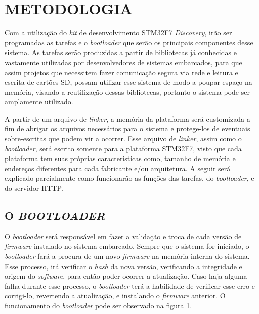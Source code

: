 
\chapter{METODOLOGIA}
\label{chap:metodologia}
Com a utilização do \textit{kit} de desenvolvimento STM32F7 \textit{Discovery}, irão ser programadas as tarefas e o \textit{bootloader} que serão os principais componentes desse sistema. As tarefas serão produzidas a partir de bibliotecas já conhecidas e vastamente utilizadas por desenvolvedores de sistemas embarcados, para que assim projetos que necessitem fazer comunicação segura via rede e leitura e escrita de cartões SD, possam utilizar esse sistema de modo a poupar espaço na memória, visando a reutilização dessas bibliotecas, portanto o sistema pode ser amplamente utilizado.


A partir de um arquivo de \textit{linker}, a memória da plataforma será customizada a fim de abrigar os arquivos necessários para o sistema e protege-los de eventuais sobre-escritas que podem vir a ocorrer. Esse arquivo de \textit{linker}, assim como o \textit{bootloader}, será escrito somente para a plataforma STM32F7, visto que cada plataforma tem suas próprias características como, tamanho de memória e endereços diferentes para cada fabricante e/ou arquitetura. A seguir será explicado parcialmente como funcionarão as funções das tarefas, do \textit{bootloader}, e do servidor HTTP.

\section{O \textit{BOOTLOADER}}
\label{sec:Bootloader}

O \textit{bootloader} será responsável em fazer a validação e troca de cada versão de \textit{firmware} instalado no sistema embarcado. Sempre que o sistema for iniciado, o \textit{bootloader} fará a procura de um novo \textit{firmware} na memória interna do sistema. Esse processo, irá verificar o \textit{hash} da nova versão, verificando a integridade e origem do \textit{software}, para então poder ocorrer a atualização. Caso haja alguma falha durante esse processo, o \textit{bootloader} terá a habilidade de verificar esse erro e corrigi-lo, revertendo a atualização, e instalando o \textit{firmware} anterior. O funcionamento do \textit{bootloader} pode ser observado na figura 1.

